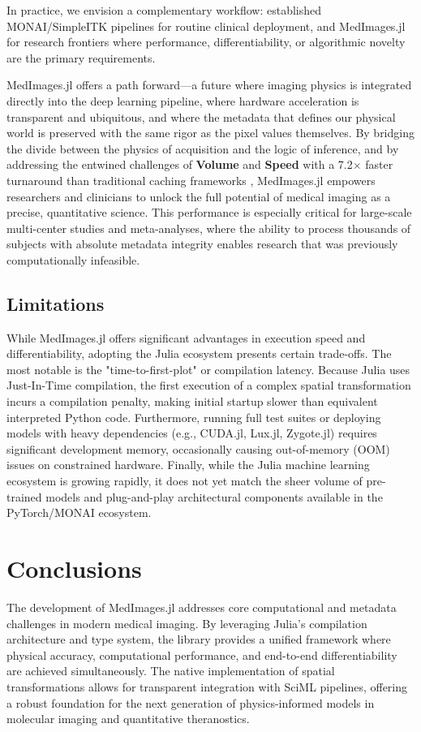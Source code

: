 \documentclass[10pt,letterpaper]{article}
\begin{document}
In practice, we envision a complementary workflow: established MONAI/SimpleITK pipelines for routine clinical deployment, and MedImages.jl for research frontiers where performance, differentiability, or algorithmic novelty are the primary requirements.

MedImages.jl offers a path forward---a future where imaging physics is integrated directly into the deep learning pipeline, where hardware acceleration is transparent and ubiquitous, and where the metadata that defines our physical world is preserved with the same rigor as the pixel values themselves. By bridging the divide between the physics of acquisition and the logic of inference, and by addressing the entwined challenges of \textbf{Volume} and \textbf{Speed} with a 7.2$\times$ faster turnaround than traditional caching frameworks \cite{Shi_2023}, MedImages.jl empowers researchers and clinicians to unlock the full potential of medical imaging as a precise, quantitative science. This performance is especially critical for large-scale multi-center studies and meta-analyses, where the ability to process thousands of subjects with absolute metadata integrity enables research that was previously computationally infeasible.


\subsection*{Limitations}
While MedImages.jl offers significant advantages in execution speed and differentiability, adopting the Julia ecosystem presents certain trade-offs. The most notable is the "time-to-first-plot" or compilation latency. Because Julia uses Just-In-Time compilation, the first execution of a complex spatial transformation incurs a compilation penalty, making initial startup slower than equivalent interpreted Python code. Furthermore, running full test suites or deploying models with heavy dependencies (e.g., CUDA.jl, Lux.jl, Zygote.jl) requires significant development memory, occasionally causing out-of-memory (OOM) issues on constrained hardware. Finally, while the Julia machine learning ecosystem is growing rapidly, it does not yet match the sheer volume of pre-trained models and plug-and-play architectural components available in the PyTorch/MONAI ecosystem.

\section{Conclusions}
The development of MedImages.jl addresses core computational and metadata challenges in modern medical imaging. By leveraging Julia's compilation architecture and type system, the library provides a unified framework where physical accuracy, computational performance, and end-to-end differentiability are achieved simultaneously. The native implementation of spatial transformations allows for transparent integration with SciML pipelines, offering a robust foundation for the next generation of physics-informed models in molecular imaging and quantitative theranostics.
\end{document}

